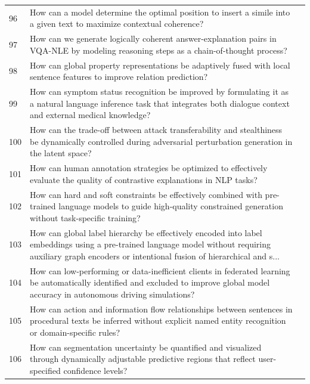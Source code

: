 \begin{longtable}{p{0.8cm}p{9cm}p{2.5cm}}
96 & How can a model determine the optimal position to insert a simile into a given text to maximize contextual coherence? & \cite{10.1609/aaai.v35i16.17691} \\
97 & How can we generate logically coherent answer-explanation pairs in VQA-NLE by modeling reasoning steps as a chain-of-thought process? & \cite{10.1609/aaai.v38i3.28065} \\
98 & How can global property representations be adaptively fused with local sentence features to improve relation prediction? & \cite{10.18653/v1/2022.findings-naacl.128} \\
99 & How can symptom status recognition be improved by formulating it as a natural language inference task that integrates both dialogue context and external medical knowledge? & \cite{10.18653/v1/2023.findings-acl.652} \\
100 & How can the trade-off between attack transferability and stealthiness be dynamically controlled during adversarial perturbation generation in the latent space? & \cite{10.1609/aaai.v38i4.28147} \\
101 & How can human annotation strategies be optimized to effectively evaluate the quality of contrastive explanations in NLP tasks? & \cite{10.18653/v1/2023.emnlp-main.427} \\
102 & How can hard and soft constraints be effectively combined with pre-trained language models to guide high-quality constrained generation without task-specific training? & \cite{10.18653/v1/2020.findings-emnlp.115} \\
103 & How can global label hierarchy be effectively encoded into label embeddings using a pre-trained language model without requiring auxiliary graph encoders or intentional fusion of hierarchical and s... & \cite{10.18653/v1/2022.emnlp-main.268} \\
104 & How can low-performing or data-inefficient clients in federated learning be automatically identified and excluded to improve global model accuracy in autonomous driving simulations? & \cite{10.1609/aaai.v37i13.26984} \\
105 & How can action and information flow relationships between sentences in procedural texts be inferred without explicit named entity recognition or domain-specific rules? & \cite{10.18653/v1/2021.findings-acl.345} \\
106 & How can segmentation uncertainty be quantified and visualized through dynamically adjustable predictive regions that reflect user-specified confidence levels? & \cite{10.1609/aaai.v37i13.26837} \\

\end{longtable}

